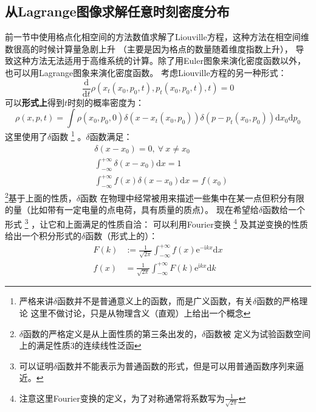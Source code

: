     \subsection{从Lagrange图像求解任意时刻密度分布}
    前一节中使用格点化相空间的方法数值求解了Liouville方程，这种方法在相空间维数很高的时候计算量急剧上升
    （主要是因为格点的数量随着维度指数上升），
    导致这种方法无法适用于高维系统的计算。除了用Euler图象来演化密度函数以外，也可以用Lagrange图象来演化密度函数。
    考虑Liouville方程的另一种形式：
    \begin{equation}
        \frac {\mathrm{d}}{\mathrm{d}t} \rho(x_t(x_0, p_0, t),p_t(x_0, p_0, t),t) = 0
    \end{equation}
    可以\textbf{形式上}得到$t$时刻的概率密度为：
    \begin{equation}
        \rho(x,p,t) = \int \rho(x_0,p_0,0)\delta(x-x_t(x_0,p_0)) \delta(p-p_t(x_0,p_0)) \mathrm{d}x_0\mathrm{d}p_0
        \label{formal solution}
    \end{equation}
    这里使用了$\delta$函数
    \footnote{
        严格来讲$\delta$函数并不是普通意义上的函数，而是广义函数，有关$\delta$函数的严格理论
        这里不做讨论，只是从物理含义（直观）上给出一个概念
    }
    。$\delta$函数满足：
    \begin{equation}
        \begin{split}
        &\delta(x-x_0) = 0, \ \forall \ x \neq x_0\\
        &\int_{-\infty}^{+\infty} \delta(x-x_0) \mathrm{d}x = 1\\
        &\int_{-\infty}^{+\infty} f(x)\delta(x-x_0) \mathrm{d}x = f(x_0)
        \end{split}
        \label{delta function}
    \end{equation}
    \footnote{$\delta$函数的严格定义是从上面性质的第三条出发的，$\delta$函数被
    定义为试验函数空间上的满足性质3的连续线性泛函}基于上面的性质，$\delta$函数
    在物理中经常被用来描述一些集中在某一点但积分有限的量（比如带有一定电量的点电荷，具有质量的质点）。
    现在希望给$\delta$函数给一个形式
    \footnote{
        可以证明$\delta$函数并不能表示为普通函数的形式，但是可以用普通函数序列来逼近。
    }
    ，让它和上面满足的性质自洽：
    可以利用Fourier变换
    \footnote{注意这里Fourier变换的定义，为了对称通常将系数写为$\frac{1}{\sqrt{2\pi}}$}
    及其逆变换的性质给出一个积分形式的$\delta$函数（形式上的）：
    \begin{equation}
        \begin{split}
            F(k) &:= \frac 1{\sqrt{2\pi}} \int_{-\infty}^{+\infty} f(x)\mathrm{e}^{-\mathrm{i}kx}\mathrm{d}x\\
            f(x) &= \frac 1{\sqrt{2\pi}} \int_{-\infty}^{+\infty} F(k)\mathrm{e}^{\mathrm{i}kx}\mathrm{d}k
        \end{split}
        \label{fourier transform}
    \end{equation}
